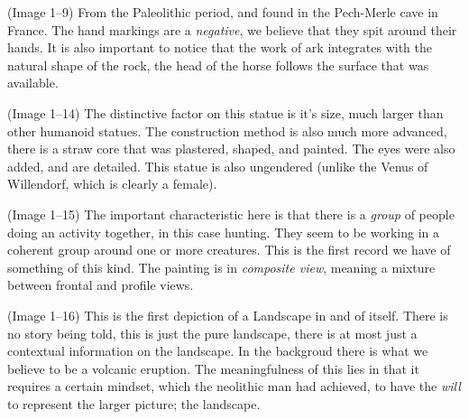 \documentclass{article}
\begin{document}
\begin{spacing}{1.2}
    (Image 1--9) From the Paleolithic period, and found in the Pech-Merle 
    cave in France. The hand markings are a \emph{negative}, we believe that
    they spit around their hands. It is also important to notice that the work
    of ark integrates with the natural shape of the rock, the head of the horse
    follows the surface that was available.

    (Image 1--14) The distinctive factor on this statue is it's size, much 
    larger than other humanoid statues. The construction method is also much
    more advanced, there is a straw core that was plastered, shaped, and
    painted. The eyes were also added, and are detailed. This statue is also
    ungendered (unlike the Venus of Willendorf, which is clearly a female).

    (Image 1--15) The important characteristic here is that there is a
    \emph{group} of people doing an activity together, in this case hunting.
    They seem to be working in a coherent group around one or more creatures.
    This is the first record we have of something of this kind. The painting is
    in \emph{composite view}, meaning a mixture between frontal and profile views.
    
    (Image 1--16) This is the first depiction of a Landscape in and of itself.
    There is no story being told, this is just the pure landscape, there is at
    most just a contextual information on the landscape. In the backgroud there
    is what we believe to be a volcanic eruption. The meaningfulness of this lies
    in that it requires a certain mindset, which the neolithic man had achieved, 
    to have the \emph{will} to represent the larger picture; the landscape.
    \end{spacing}
    
\end{document}
